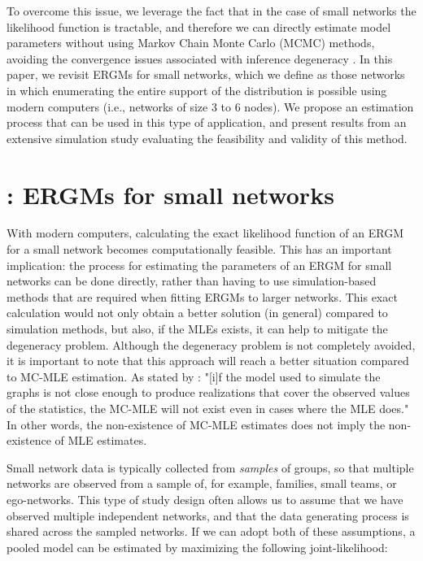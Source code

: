 \documentclass[12pt]{article}
\begin{document}
To overcome this issue, we leverage the fact that in the case of small networks the likelihood function is tractable, and therefore we can directly estimate model parameters without using Markov Chain Monte Carlo (MCMC) methods, avoiding the convergence issues associated with inference degeneracy \cite{Handcock2003}. In this paper, we revisit ERGMs for small networks, which we define as those networks in which enumerating the entire support of the distribution is possible using modern computers (i.e., networks of size 3 to 6 nodes). We propose an estimation process that can be used in this type of application, and present results from an extensive simulation study evaluating the feasibility and validity of this method.

\section{\ergmitos{}: ERGMs for small networks}

With modern computers, calculating the exact likelihood function of an ERGM for a small network becomes computationally feasible. This has an important implication: the process for estimating the parameters of an ERGM for small networks can be done directly, rather than having to use simulation-based methods that are required when fitting ERGMs to larger networks. This exact calculation would not only obtain a better solution (in general) compared to simulation methods, but also, if the MLEs exists, it can help to mitigate the degeneracy problem. Although the degeneracy problem is not completely avoided, it is important to note that this approach will reach a better situation compared to MC-MLE estimation. As stated by \cite[p. 7]{Handcock2003}: "[i]f the model used to simulate the graphs is not close enough to produce realizations that cover the observed values of the statistics, the MC-MLE will not exist even in cases where the MLE does." In other words, the non-existence of MC-MLE estimates does not imply the non-existence of MLE estimates.

Small network data is typically collected from \textit{samples} of groups, so that multiple networks are observed from a sample of, for example, families, small teams, or ego-networks. This type of study design often allows us to assume that we have observed multiple independent networks, and that the data generating process is shared across the sampled networks. If we can adopt both of these assumptions, a pooled model can be estimated by maximizing the following joint-likelihood:
\end{document}
